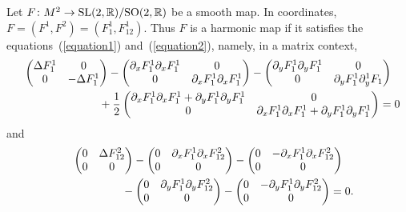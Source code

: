 \documentclass[10pt,a4paper]{amsart}
\numberwithin{equation}{section}
\begin{document}
Let $F\colon M^2 \rightarrow {\rm SL}(2,{\mathbb R})/{\rm SO}(2,{\mathbb R})$ be a smooth map. In coordinates,   $F = (F^1,F^2)=(F^1_1,F^1_{12})$. Thus $F$ is a harmonic map if it satisf\/ies the equations~(\ref{equation1}) and~(\ref{equation2}), namely, in a matrix context,
\begin{gather*}
  \left(
  \begin{matrix}
    \Delta F^1_{1} & 0 \\
    0 & -\Delta F^1_{1}
  \end{matrix}
  \right)
  -
  \left(
  \begin{matrix}
    \partial_x F^1_1 \partial_x F^1_{1} & 0\\
    0 & \partial_x F^1_1 \partial_x F^1_{1}
  \end{matrix}
  \right)
  -
  \left(
  \begin{matrix}
    \partial_yF^1_1\partial_yF^1_1 & 0 \\
    0 & \partial_yF^1_1\partial_y^1F_1
  \end{matrix}
  \right)
    \\
  \hphantom{  \left(
  \begin{matrix}
    \Delta F^1_{1} & 0 \\
    0 & -\Delta F^1_{1}
  \end{matrix}
  \right)}{}
  + \frac{1}{2}\left(
  \begin{matrix}
    \partial_x F^1_1 \partial_x F^1_{1} + \partial_yF^1_1\partial_yF^1_{1} & 0 \\
    0 & \partial_x F^1_1 \partial_x F^1_{1}+ \partial_yF^1_1\partial_yF^1_{1}
  \end{matrix}
  \right) =   0
\end{gather*}
and
\begin{gather*}
  \left(
  \begin{matrix}
    0 & \Delta F^2_{12}\\
    0 & 0
  \end{matrix}
  \right)
  -
  \left(
  \begin{matrix}
    0 & \partial_x F^1_1 \partial_x F^2_{12} \\
    0 & 0
  \end{matrix}
  \right)
  -
  \left(
  \begin{matrix}
    0 & -\partial_xF^1_1\partial_xF^2_{12}  \\
    0 & 0
  \end{matrix}
  \right)
 \\
\hphantom{  \left(
  \begin{matrix}
    0 & \Delta F^2_{12}\\
    0 & 0
  \end{matrix}
  \right)}{}
  -
  \left(
  \begin{matrix}
    0 & \partial_yF^1_1\partial_yF^2_{12}\\
    0 & 0
  \end{matrix}
  \right)
  -
  \left(
  \begin{matrix}
    0 & -\partial_yF^1_1\partial_yF^2_{12}\\
    0 & 0
  \end{matrix}
  \right)
    =   0.
\end{gather*}
\end{document}
